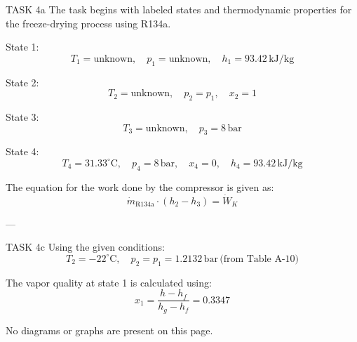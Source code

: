 TASK 4a  
The task begins with labeled states and thermodynamic properties for the freeze-drying process using R134a.  

State 1:  
\[
T_1 = \text{unknown}, \quad p_1 = \text{unknown}, \quad h_1 = 93.42 \, \text{kJ/kg}
\]  

State 2:  
\[
T_2 = \text{unknown}, \quad p_2 = p_1, \quad x_2 = 1
\]  

State 3:  
\[
T_3 = \text{unknown}, \quad p_3 = 8 \, \text{bar}
\]  

State 4:  
\[
T_4 = 31.33^\circ \text{C}, \quad p_4 = 8 \, \text{bar}, \quad x_4 = 0, \quad h_4 = 93.42 \, \text{kJ/kg}
\]  

The equation for the work done by the compressor is given as:  
\[
\dot{m}_{\text{R134a}} \cdot (h_2 - h_3) = \dot{W}_K
\]  

---

TASK 4c  
Using the given conditions:  
\[
T_2 = -22^\circ \text{C}, \quad p_2 = p_1 = 1.2132 \, \text{bar} \, \text{(from Table A-10)}
\]  

The vapor quality at state 1 is calculated using:  
\[
x_1 = \frac{h - h_f}{h_g - h_f} = 0.3347
\]  

No diagrams or graphs are present on this page.